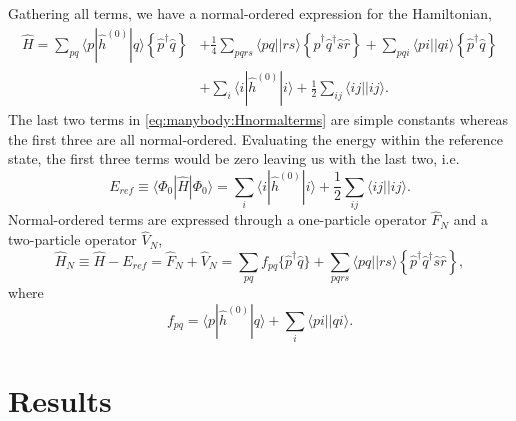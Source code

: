 \paragraph*{}
Gathering all terms, we have a normal-ordered expression for the Hamiltonian,
\begin{equation}
\label{eq:manybody:Hnormalterms}
\begin{split}
\hat{H} 
=
\sum_{pq} \langle p|\hat{h}^{(0)} | q\rangle 
\left\lbrace \hat{p}^{\dagger} \hat{q} \right\rbrace
&+
\frac{1}{4} \sum_{pqrs} \langle pq || rs \rangle \left\lbrace
 \hat{p}^{\dagger} \hat{q}^{\dagger} \hat{s} \hat{r} \right\rbrace
+
\sum_{pqi} \langle pi || qi \rangle 
 \left\lbrace \hat{p}^{\dagger} \hat{q} \right\rbrace  \\
&+
\sum_i \langle i | \hat{h}^{(0)} | i \rangle
+
\frac{1}{2} \sum_{ij} \langle ij || ij \rangle .
\end{split}
\end{equation}
The last two terms in \eqref{eq:manybody:Hnormalterms} are simple constants whereas the first three are all normal-ordered.
Evaluating the energy within the reference state, the first three terms would be zero leaving us with the last two, i.e.
\begin{equation}
E_{ref} \equiv \langle \Phi_0 | \hat{H} | \Phi_0 \rangle 
= 
\sum_i \langle i | \hat{h}^{(0)} | i \rangle
+
\frac{1}{2} \sum_{ij} \langle ij || ij \rangle .
\end{equation}
Normal-ordered terms are expressed through a one-particle operator $\hat{F}_N$ and a two-particle operator $\hat{V}_N$,
\begin{equation}
\label{eq:manybody:normhamil}
\hat{H}_N \equiv \hat{H} - E_{ref} 
=
\hat{F}_N + \hat{V}_N
= 
\sum_{pq} f_{pq} \lbrace \hat{p}^{\dagger} \hat{q} \rbrace
+
\sum_{pqrs} \langle pq||rs \rangle 
\left\lbrace \hat{p}^{\dagger} \hat{q}^{\dagger} \hat{s} \hat{r} \right\rbrace ,
\end{equation}
where 
\begin{equation}
\label{eq:manybody:f_elem}
f_{pq} = \langle p | \hat{h}^{(0)} | q \rangle + \sum_i \langle pi||qi \rangle .
\end{equation}







\chapter{Results}

